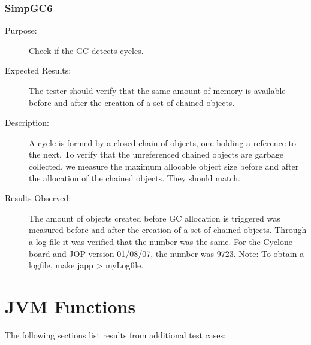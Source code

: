 \subsubsection{SimpGC6}

\begin{description}
    \item[Purpose:]
Check if the GC detects cycles.
    \item[Expected Results:]
The tester should verify that the same amount of memory is available
before and after the creation of a set of chained objects.
    \item[Description:]
A cycle is formed by a closed chain of objects, one holding a
reference to the next. To verify that the unreferenced chained
objects are garbage collected, we measure the maximum allocable
object size before and after the allocation of the chained objects.
They should match.
    \item[Results Observed:]
The amount of objects created before GC allocation is triggered was
measured before and after the creation of a set of chained objects.
Through a log file it was verified that the number was the same. For
the Cyclone board and JOP version 01/08/07, the number was 9723.
Note: To obtain a logfile, make japp > myLogfile.
\end{description}

\section{JVM Functions}

The following sections list results from additional test cases:

